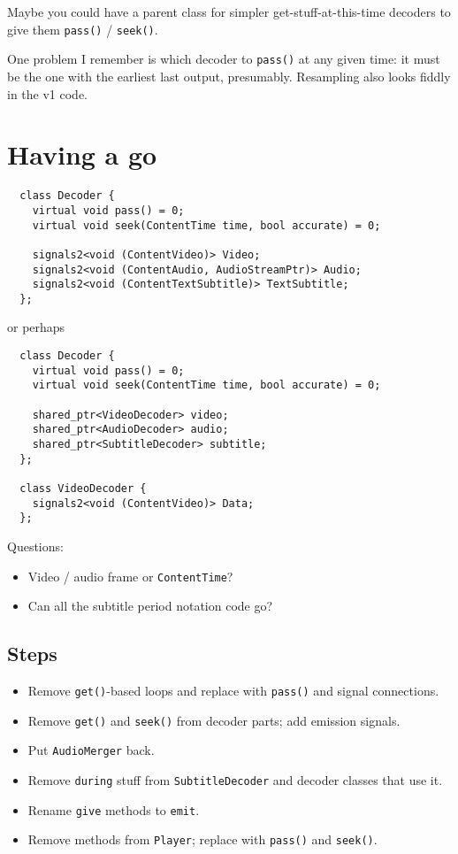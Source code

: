 \documentclass{article}
\begin{document}
Maybe you could have a parent class for simpler get-stuff-at-this-time
decoders to give them \texttt{pass()} / \texttt{seek()}.

One problem I remember is which decoder to \texttt{pass()} at any given time:
it must be the one with the earliest last output, presumably.
Resampling also looks fiddly in the v1 code.


\section{Having a go}

\begin{lstlisting}
  class Decoder {
    virtual void pass() = 0;
    virtual void seek(ContentTime time, bool accurate) = 0;

    signals2<void (ContentVideo)> Video;
    signals2<void (ContentAudio, AudioStreamPtr)> Audio;
    signals2<void (ContentTextSubtitle)> TextSubtitle;
  };
\end{lstlisting}

or perhaps

\begin{lstlisting}
  class Decoder {
    virtual void pass() = 0;
    virtual void seek(ContentTime time, bool accurate) = 0;

    shared_ptr<VideoDecoder> video;
    shared_ptr<AudioDecoder> audio;
    shared_ptr<SubtitleDecoder> subtitle;
  };

  class VideoDecoder {
    signals2<void (ContentVideo)> Data;
  };
\end{lstlisting}

Questions:
\begin{itemize}
\item Video / audio frame or \texttt{ContentTime}?
\item Can all the subtitle period notation code go?
\end{itemize}

\subsection{Steps}

\begin{itemize}
  \item Remove \texttt{get()}-based loops and replace with \texttt{pass()} and signal connections.
  \item Remove \texttt{get()} and \texttt{seek()} from decoder parts; add emission signals.
  \item Put \texttt{AudioMerger} back.
  \item Remove \texttt{during} stuff from \texttt{SubtitleDecoder} and decoder classes that use it.
  \item Rename \texttt{give} methods to \texttt{emit}.
  \item Remove  methods from \texttt{Player}; replace with \texttt{pass()} and \texttt{seek()}.
\end{itemize}
\end{document}
